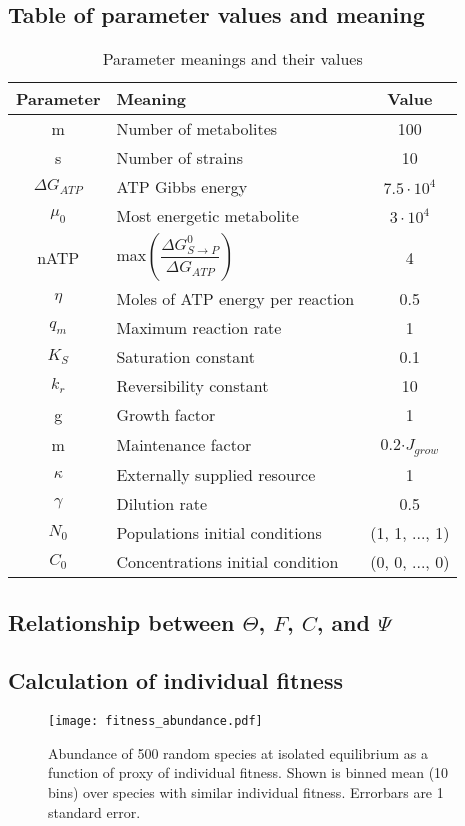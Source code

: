 \documentclass[titlepage,11pt]{article}
\begin{document}
\begin{linenumbers}
\begin{singlespace}
\subsection{Table of parameter values and meaning}\label{subsec:parameters}
\begin{table}[h]
	\centering
	\begin{tabular}{ |c|l|c| } 
		\hline
		Parameter & Meaning & Value \\
		\hline
		m &Number of metabolites &  100 \\ 
		s &Number of strains &  10 \\ 
		$ \Delta G_{ATP} $ &ATP Gibbs energy & $ 7.5\cdot 10^{4} $\\ 
		$ \mu_0 $ & Most energetic metabolite &  $ 3\cdot 10^{4} $ \\ 
		nATP &max$\left(\dfrac{\Delta G^{0}_{S\rightarrow P}}{\Delta G_{ATP}}\right)$ &  4 \\ 
		$ \eta $ &Moles of ATP energy per reaction &  0.5  \\ 
		$ q_m $ &Maximum reaction rate &  1 \\ 
		$ K_S $ &Saturation constant &   0.1 \\ 
		$ k_r $ &Reversibility constant &  10 \\ 
		g & Growth factor & 1 \\ 
		m  & Maintenance factor &   0.2$\cdot J_{grow}$ \\ 
		$ \kappa $  & Externally supplied resource &  1 \\ 
		$ \gamma $ &Dilution rate &   0.5 \\ 
		$ N_{0}$ & Populations initial conditions &   (1, 1, ..., 1)\\ 
		$ C_{0}$ & Concentrations initial condition &   (0, 0, ..., 0)\\
		\hline
	\end{tabular}
	\caption{Parameter meanings and their values}
	\label{tab:parameters}
\end{table}
\subsection{Relationship between $ \Theta $, $ F $, $ C $, and $ \Psi $}\label{subsec:relationships}
\subsection{Calculation of individual fitness}\label{subsec:fitness_calculation}
\begin{figure}
	\centering			
	\texttt{[image: fitness\_abundance.pdf]}
	\caption{Abundance of 500 random species at isolated equilibrium as a function of proxy of individual fitness. Shown is binned mean (10 bins) over species with similar individual fitness. Errorbars are 1 standard error.}
	\label{fig:fitness_abundance}
\end{figure}
\end{singlespace}
\end{linenumbers}

	\clearpage
	
	
\end{document}
